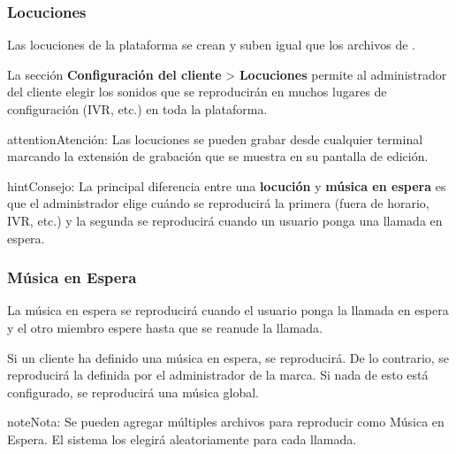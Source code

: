\documentclass[letterpaper,10pt,spanish]{sphinxmanual}
\begin{document}
\subsubsection{Locuciones}
\label{administration_portal/client/vpbx/multimedia/locutions:locutions}\label{administration_portal/client/vpbx/multimedia/locutions::doc}
Las locuciones de la plataforma se crean y suben igual que los archivos de {\hyperref[administration_portal/client/vpbx/multimedia/music_on_hold:musiconhold]{}}.

La sección \textbf{Configuración del cliente} \textgreater{} \textbf{Locuciones} permite al administrador del cliente elegir los sonidos que se reproducirán en muchos lugares de configuración (IVR, etc.) en toda la plataforma.

\begin{notice}{attention}{Atención:}
Las locuciones se pueden grabar desde cualquier terminal marcando la extensión de grabación que se muestra en su pantalla de edición.
\end{notice}

\begin{notice}{hint}{Consejo:}
La principal diferencia entre una \textbf{locución} y \textbf{música en espera} es que el administrador elige cuándo se reproducirá la primera (fuera de horario, IVR, etc.) y la segunda se reproducirá cuando un usuario ponga una llamada en espera.
\end{notice}
\label{administration_portal/client/vpbx/multimedia/music_on_hold:musiconhold}

\subsubsection{Música en Espera}
\label{administration_portal/client/vpbx/multimedia/music_on_hold:music-on-hold}\label{administration_portal/client/vpbx/multimedia/music_on_hold::doc}\label{administration_portal/client/vpbx/multimedia/music_on_hold:musiconhold}\label{administration_portal/client/vpbx/multimedia/music_on_hold:id1}
La música en espera se reproducirá cuando el usuario ponga la llamada en espera y el otro miembro espere hasta que se reanude la llamada.

Si un cliente ha definido una música en espera, se reproducirá. De lo contrario, se reproducirá la definida por el administrador de la marca. Si nada de esto está configurado, se reproducirá una música global.

\begin{notice}{note}{Nota:}
Se pueden agregar múltiples archivos para reproducir como Música en Espera. El sistema los elegirá aleatoriamente para cada llamada.
\end{notice}
\end{document}
